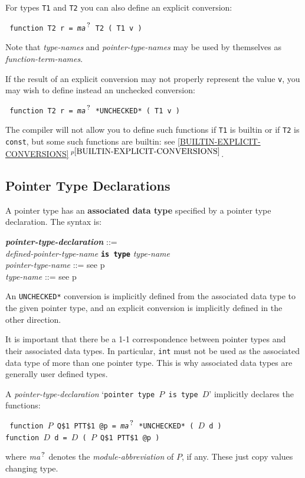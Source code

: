 \documentclass[12pt]{article}
\newcommand{\TT}[1]{{\tt \bfseries #1}}
\newcommand{\QMARK}{{$^{\,\mbox{\footnotesize ?}}$}}
\newcommand{\key}[1]{{\rm \bfseries #1}}
\newcommand{\ttkey}[1]{{\tt \bfseries #1}}
\newcommand{\emkey}[1]{{\em \bfseries #1}}
\newcommand{\itemref}[1]{\ref{#1}$\,^{p\pageref{#1}}$}
\newcommand{\pagref}[1]{p\pageref{#1}}
\newenvironment{indpar}[1][0.3in]%
	{\begin{list}{}%
		     {\setlength{\itemsep}{0in}%
		      \setlength{\topsep}{0in}%
		      \setlength{\parsep}{1ex}%
		      \setlength{\labelwidth}{#1}%
		      \setlength{\leftmargin}{#1}%
		      \addtolength{\leftmargin}{\labelsep}}%
	 \item}%
	{\end{list}}
\begin{document}
For types {\tt T1} and {\tt T2} you
can also define an explicit conversion:
\begin{indpar} \tt
function T2 r = {\em ma}\QMARK{} T2 ( T1 v )
\end{indpar}
Note that {\em type-names} and {\em pointer-type-names} may be
used by themselves as {\em function-term-names}.

If the result of an explicit conversion
may not properly represent the value {\tt v}, you
may wish to define instead an unchecked conversion:
\begin{indpar} \tt
function T2 r = {\em ma}\QMARK{} *UNCHECKED* ( T1 v )
\end{indpar}
The compiler will not allow you to define such functions if
{\tt T1} is builtin or if {\tt T2} is {\tt const},
but some such functions are
builtin: see \itemref{BUILTIN-EXPLICIT-CONVERSIONS}.

\subsection{Pointer Type Declarations}
\label{POINTER-TYPE-DECLARATIONS}

A pointer type has an
\key{associated data type}\label{POINTER-ASSOCIATE}
specified by a pointer type declaration.  The syntax is:

\begin{indpar}
\emkey{pointer-type-declaration}\label{POINTER-TYPE-DECLARATION} ::= \\
\hspace*{0.5in}\ttkey{pointer type} {\em defined-pointer-type-name}
	       \TT{is type} {\em type-name}
\\[0.5ex]
{\em pointer-type-name} ::= see \pagref{POINTER-TYPE-NAME}
\\[0.5ex]
{\em type-name} ::= see \pagref{TYPE-NAME}
\end{indpar}
An {\tt *UNCHECKED*} conversion is implicitly defined from the associated data
type to the given pointer type, and an explicit conversion
is implicitly defined in the other direction.

It is important that there be a 1-1 correspondence between
pointer types and their associated data types.  In particular,
{\tt int} must not be used as the associated data type of
more than one pointer type.  This is why associated data types
are generally user defined types.

A {\em pointer-type-declaration} `{\tt pointer type $P$ is type $D$}'
implicitly declares the functions:
\begin{indpar} \tt
function $P$ Q\$1 PTT\$1 @p = {\em ma}\QMARK{} *UNCHECKED* ( $D$ d ) \\
function $D$ d = $D$ ( $P$ Q\$1 PTT\$1 @p )
\end{indpar}
where {\em ma}\QMARK{} denotes the {\em module-abbreviation} of $P$,
if any.
These just copy values changing type.
\end{document}
